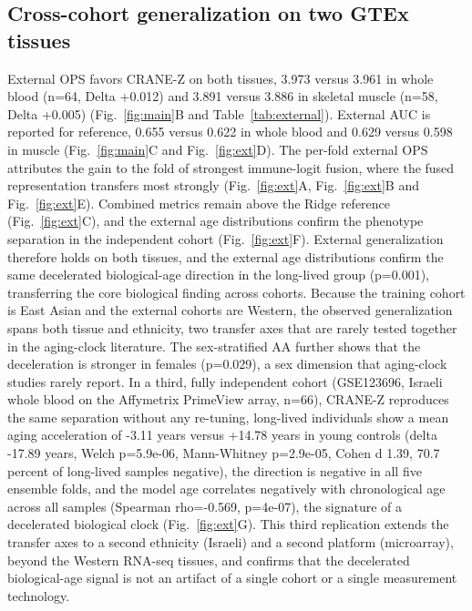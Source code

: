 \documentclass[11pt,a4paper]{article}
\begin{document}
\subsection{Cross-cohort generalization on two GTEx tissues}\label{sec:res3}
External OPS favors CRANE-Z on both tissues, 3.973 versus 3.961 in whole blood (n=64, Delta +0.012) and 3.891 versus 3.886 in skeletal muscle (n=58, Delta +0.005) (Fig.~\ref{fig:main}B and Table~\ref{tab:external}). External AUC is reported for reference, 0.655 versus 0.622 in whole blood and 0.629 versus 0.598 in muscle (Fig.~\ref{fig:main}C and Fig.~\ref{fig:ext}D). The per-fold external OPS attributes the gain to the fold of strongest immune-logit fusion, where the fused representation transfers most strongly (Fig.~\ref{fig:ext}A, Fig.~\ref{fig:ext}B and Fig.~\ref{fig:ext}E). Combined metrics remain above the Ridge reference (Fig.~\ref{fig:ext}C), and the external age distributions confirm the phenotype separation in the independent cohort (Fig.~\ref{fig:ext}F). External generalization therefore holds on both tissues, and the external age distributions confirm the same decelerated biological-age direction in the long-lived group (p=0.001), transferring the core biological finding across cohorts. Because the training cohort is East Asian and the external cohorts are Western, the observed generalization spans both tissue and ethnicity, two transfer axes that are rarely tested together in the aging-clock literature. The sex-stratified AA further shows that the deceleration is stronger in females (p=0.029), a sex dimension that aging-clock studies rarely report. In a third, fully independent cohort (GSE123696, Israeli whole blood on the Affymetrix PrimeView array, n=66), CRANE-Z reproduces the same separation without any re-tuning, long-lived individuals show a mean aging acceleration of -3.11 years versus +14.78 years in young controls (delta -17.89 years, Welch p=5.9e-06, Mann-Whitney p=2.9e-05, Cohen d 1.39, 70.7 percent of long-lived samples negative), the direction is negative in all five ensemble folds, and the model age correlates negatively with chronological age across all samples (Spearman rho=-0.569, p=4e-07), the signature of a decelerated biological clock (Fig.~\ref{fig:ext}G). This third replication extends the transfer axes to a second ethnicity (Israeli) and a second platform (microarray), beyond the Western RNA-seq tissues, and confirms that the decelerated biological-age signal is not an artifact of a single cohort or a single measurement technology.
\end{document}
